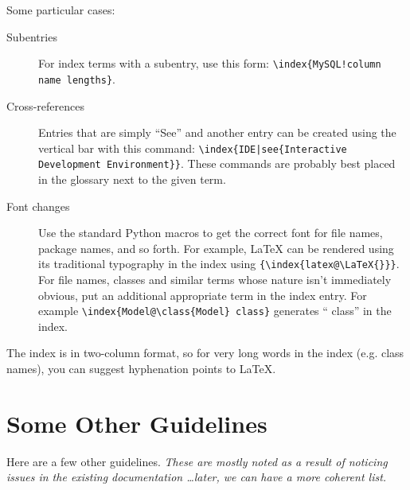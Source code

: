 Some particular cases:

\begin{description}

\item[Subentries] For index terms with a subentry, use this form:
  \verb|\index{MySQL!column name lengths}|.

\item[Cross-references] Entries that are simply ``See'' and another entry
  can be created using the vertical bar with this command:
  \verb+\index{IDE|see{Interactive Development Environment}}+.  These
  commands are probably best placed in the glossary next to the given term.

\item[Font changes] Use the standard Python macros to get the correct font
  for file names, package names, and so forth.  For example, \LaTeX{}
  can be rendered using its traditional typography in the
  index using \verb|{\index{latex@\LaTeX{}}}|.  For file names, classes and
  similar terms whose nature isn't immediately obvious, put an additional
  appropriate term in the index entry.  For example
  \verb|\index{Model@\class{Model} class}| generates `` class''
  in the index.

\end{description}

The index is in two-column format, so for very long words in the index (e.g. 
class names), you can suggest hyphenation points to \LaTeX{}.

\section{Some Other Guidelines}

Here are a few other guidelines.  \emph{These are mostly noted as a result
  of noticing issues in the existing documentation \ldots later, we can
  have a more coherent list.}

